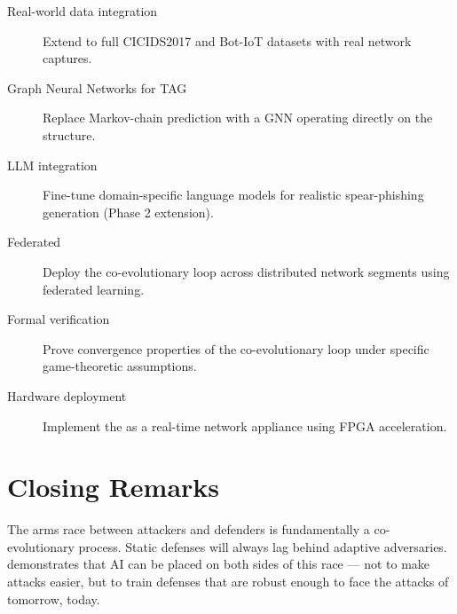 \begin{description}
  \item[Real-world data integration] Extend to full CICIDS2017 and Bot-IoT
    datasets with real network captures.
  \item[Graph Neural Networks for TAG] Replace Markov-chain prediction with
    a GNN operating directly on the \tagraph{} structure.
  \item[LLM integration] Fine-tune domain-specific language models for
    realistic spear-phishing generation (Phase 2 extension).
  \item[Federated \caesar{}] Deploy the co-evolutionary loop across
    distributed network segments using federated learning.
  \item[Formal verification] Prove convergence properties of the
    co-evolutionary loop under specific game-theoretic assumptions.
  \item[Hardware deployment] Implement the \arl{} as a real-time network
    appliance using FPGA acceleration.
\end{description}

\section{Closing Remarks}

The arms race between attackers and defenders is fundamentally a
co-evolutionary process. Static defenses will always lag behind adaptive
adversaries. \caesar{} demonstrates that AI can be placed on both sides
of this race — not to make attacks easier, but to train defenses that are
robust enough to face the attacks of tomorrow, today.
